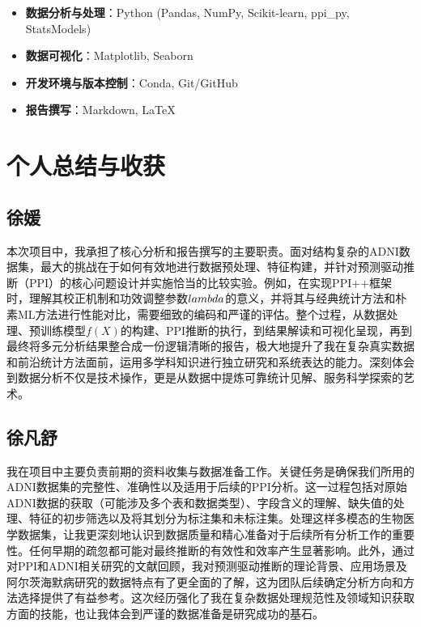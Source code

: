 \documentclass[12pt,a4paper]{article}
\begin{document}
\begin{itemize}
\item \textbf{数据分析与处理}：Python (Pandas, NumPy, Scikit-learn, ppi_py, StatsModels)
\item \textbf{数据可视化}：Matplotlib, Seaborn
\item \textbf{开发环境与版本控制}：Conda, Git/GitHub
\item \textbf{报告撰写}：Markdown, LaTeX
\end{itemize}


\section{个人总结与收获}
\subsection{徐媛}

本次项目中，我承担了核心分析和报告撰写的主要职责。面对结构复杂的ADNI数据集，最大的挑战在于如何有效地进行数据预处理、特征构建，并针对预测驱动推断（PPI）的核心问题设计并实施恰当的比较实验。例如，在实现PPI++框架时，理解其校正机制和功效调整参数$\\lambda$的意义，并将其与经典统计方法和朴素ML方法进行性能对比，需要细致的编码和严谨的评估。整个过程，从数据处理、预训练模型$f(X)$的构建、PPI推断的执行，到结果解读和可视化呈现，再到最终将多元分析结果整合成一份逻辑清晰的报告，极大地提升了我在复杂真实数据和前沿统计方法面前，运用多学科知识进行独立研究和系统表达的能力。深刻体会到数据分析不仅是技术操作，更是从数据中提炼可靠统计见解、服务科学探索的艺术。

\subsection{徐凡舒}

我在项目中主要负责前期的资料收集与数据准备工作。关键任务是确保我们所用的ADNI数据集的完整性、准确性以及适用于后续的PPI分析。这一过程包括对原始ADNI数据的获取（可能涉及多个表和数据类型）、字段含义的理解、缺失值的处理、特征的初步筛选以及将其划分为标注集和未标注集。处理这样多模态的生物医学数据集，让我更深刻地认识到数据质量和精心准备对于后续所有分析工作的重要性。任何早期的疏忽都可能对最终推断的有效性和效率产生显著影响。此外，通过对PPI和ADNI相关研究的文献回顾，我对预测驱动推断的理论背景、应用场景及阿尔茨海默病研究的数据特点有了更全面的了解，这为团队后续确定分析方向和方法选择提供了有益参考。这次经历强化了我在复杂数据处理规范性及领域知识获取方面的技能，也让我体会到严谨的数据准备是研究成功的基石。
\end{document}
